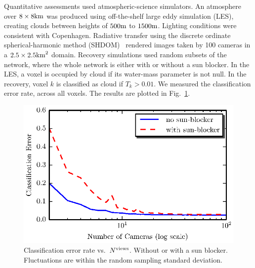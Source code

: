 \documentclass[runningheads]{llncs}
\begin{document}
Quantitative assessments used atmospheric-science simulators.
An atmosphere over $8\times8{\rm km}$  was produced using off-the-shelf large eddy simulation (LES), creating clouds between heights of $500{\rm m}$ to $1500{\rm m}$.
Lighting conditions were consistent with Copenhagen.
Radiative transfer using the discrete ordinate spherical-harmonic method (SHDOM)~\cite{Evans1998} rendered images taken by 100 cameras in a $2.5\times 2.5{\rm km}^2$ domain. Recovery simulations used random subsets
of the network, where the whole network is either with or without
a sun blocker. In the LES, a voxel is occupied by cloud if its water-mass parameter is not null. In the recovery, voxel $k$ is classified as cloud if $T_k>0.01$.
We measured the classification error rate, across all voxels.
The results are plotted in Fig.~\ref{fig:simulations}. 
\begin{figure}[t]
  \begin{center}
    \includegraphics[width=0.65\linewidth]{simulations.eps}
    \vspace{-0.2cm}
    \caption{Classification error rate vs.~{$N^{\rm views}$}. Without or with a sun blocker.  Fluctuations are within the random sampling standard deviation.}
    \label{fig:simulations}
  \end{center}
\end{figure}
\end{document}
